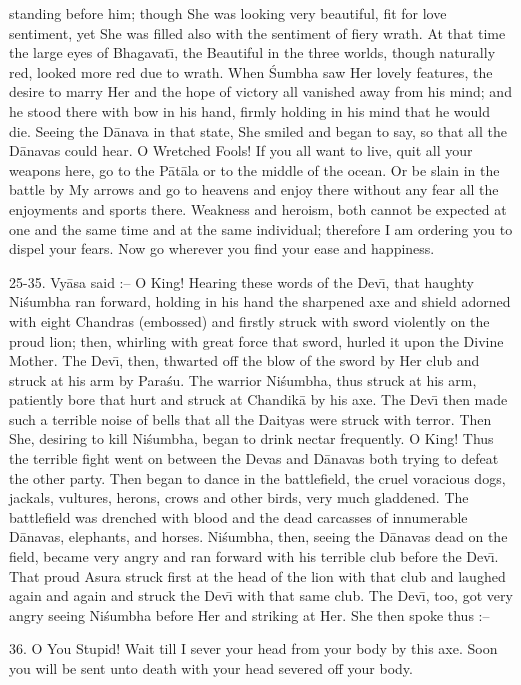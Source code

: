 standing before him; though She was looking very beautiful, fit for love sentiment, yet She was filled also with the sentiment of fiery wrath. At that time the large eyes of Bhagavat\={\i}, the Beautiful in the three worlds, though naturally red, looked more red due to wrath. When \'Sumbha saw Her lovely features, the desire to marry Her and the hope of victory all vanished away from his mind; and he stood there with bow in his hand, firmly holding in his mind that he would die. Seeing the D\=anava in that state, She smiled and began to say, so that all the D\=anavas could hear. O Wretched Fools! If you all want to live, quit all your weapons here, go to the P\=at\=ala or to the middle of the ocean. Or be slain in the battle by My arrows and go to heavens and enjoy there without any fear all the enjoyments and sports there. Weakness and heroism, both cannot be expected at one and the same time and at the same individual; therefore I am ordering you to dispel your fears. Now go wherever you find your ease and happiness.

25-35. Vy\=asa said :-- O King! Hearing these words of the Dev\={\i}, that haughty Ni\'sumbha ran forward, holding in his hand the sharpened axe and shield adorned with eight Chandras (embossed) and firstly struck with sword violently on the proud lion; then, whirling with great force that sword, hurled it upon the Divine Mother. The Dev\={\i}, then, thwarted off the blow of the sword by Her club and struck at his arm by Para\'su. The warrior Ni\'sumbha, thus struck at his arm, patiently bore that hurt and struck at Chandik\=a by his axe. The Dev\={\i} then made such a terrible noise of bells that all the Daityas were struck with terror. Then She, desiring to kill Ni\'sumbha, began to drink nectar frequently. O King! Thus the terrible fight went on between the Devas and D\=anavas both trying to defeat the other party. Then began to dance in the battlefield, the cruel voracious dogs, jackals, vultures, herons, crows and other birds, very much gladdened. The battlefield was drenched with blood and the dead carcasses of innumerable D\=anavas, elephants, and horses. Ni\'sumbha, then, seeing the D\=anavas dead on the field, became very angry and ran forward with his terrible club before the Dev\={\i}. That proud Asura struck first at the head of the lion with that club and laughed again and again and struck the Dev\={\i} with that same club. The Dev\={\i}, too, got very angry seeing Ni\'sumbha before Her and striking
at Her. She then spoke thus :--

36. O You Stupid! Wait till I sever your head from your body by this axe. Soon you will be sent unto death with your head severed off your body.

